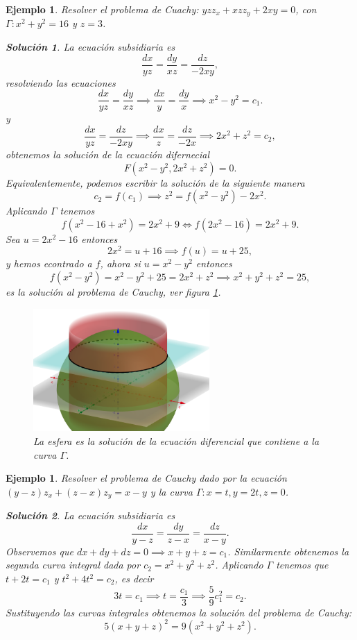 \documentclass[11pt,letterpaper]{report}
\newtheorem{example}[defn]{Ejemplo}
\newtheorem*{sol}{Solución}
\newcommand\<{\langle}
\renewcommand\>{\rangle}
\begin{document}
\begin{example}
  Resolver el problema de Cuachy: $yz z_x + xz z_y + 2xy =
  0$, con $\Gamma : x^2 + y^2 = 16$ y $z = 3$.
  \begin{sol}
    La ecuación subsidiaria es
    \[
    \frac{dx}{yz} = \frac{dy}{xz} = \frac{dz}{-2xy},
    \] 
    resolviendo las ecuaciones
    \[
    \frac{dx}{yz} = \frac{dy}{xz} \implies \frac{dx}{y} =
    \frac{dy}{x} \implies x^2 - y^2 = c_1.
    \]
    y
    \[
    \frac{dx}{yz} = \frac{dz}{-2xy} \implies \frac{dx}{z} =
    \frac{dz}{-2x} \implies 2x^2 + z^2 = c_2,
    \] 
    obtenemos la solución de la ecuación difernecial
    \[
    F(x^2 - y^2, 2x^2 + z^2) = 0.
    \] 
    Equivalentemente, podemos escribir la solución de la
    siguiente manera
    \[
    c_2 = f(c_1) \implies z^2 = f(x^2-y^2) - 2x^2.
    \] 
    Aplicando $\Gamma$ tenemos
    \[
    f(x^2 - 16 + x^2) = 2x^2 + 9 \iff f(2x^2 - 16) = 2x^2 +
    9.
    \]
    Sea $u = 2x^2 - 16$ entonces
    \[
    2x^2 = u + 16 \implies f(u) = u + 25,
    \] 
    y hemos econtrado a $f$, ahora si $u = x^2 - y^2$
    entonces
    \[
    f(x^2-y^2) = x^2-y^2 + 25 = 2x^2 + z^2 \implies x^2 +
    y^2 + z^2 = 25,
    \] 
    es la solución al problema de Cauchy, ver figura
    \ref{fig:cauchy-esfera-ejemplo}.
    \begin{figure}[ht]
      \centering
      \includegraphics[width=0.6\textwidth]{imgs/cauchy-esfera.png}
      \caption{La esfera es la solución de la ecuación
      diferencial que contiene a la curva $\Gamma$.}
      \label{fig:cauchy-esfera-ejemplo}
    \end{figure}
  \end{sol}
\end{example}

\begin{example}
  Resolver el problema de Cauchy dado por la ecuación
  $(y-z)z_x + (z-x)z_y = x-y$ y la curva $\Gamma : x = t, y
  = 2t, z = 0$.
  \begin{sol}
    La ecuación subsidiaria es
    \[
    \frac{dx}{y-z} = \frac{dy}{z-x} = \frac{dz}{x-y}.
    \] 
    Observemos que $dx + dy + dz = 0 \implies x + y + z =
    c_1$. Similarmente obtenemos la segunda curva integral
    dada por $c_2 = x^2 + y^2 + z^2$. Aplicando $\Gamma$ 
    tenemos que $t + 2t = c_1$ y $t^2 + 4t^2 = c_2$, es
    decir
    \[
    3t = c_1 \implies t = \frac{c_1}{3} \implies
    \frac{5}{9}c_1^2 = c_2.
    \] 
    Sustituyendo las curvas integrales obtenemos la
    solución del problema de Cauchy:
    \[
    5(x+y+z)^2 = 9(x^2+y^2+z^2).
    \] 
  \end{sol}
\end{example}
\end{document}
